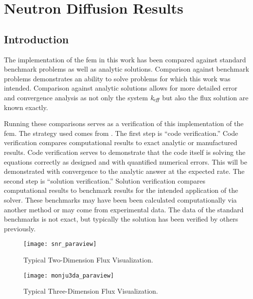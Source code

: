 \chapter{Neutron Diffusion Results}
\label{ch:diffusionResults}

\section{Introduction}
  The implementation of the \gls{fem} in this work has been compared
  against standard benchmark problems as well as analytic solutions. Comparison 
  against benchmark problems demonstrates an ability to solve problems for which 
  this work was intended. Comparison against analytic solutions allows for more 
  detailed error and convergence analysis as not only the system $k_{\!\mbox{\scriptsize \em eff}}$ but 
  also the flux solution are known exactly. 

  Running these comparisons serves as a verification of this implementation of 
  the \gls{fem}. The strategy used comes from \cite{oberkampf}. The first step is 
  ``code verification.'' Code verification compares computational results to 
  exact analytic or manufactured results. Code verification serves to 
  demonstrate that the code itself is solving the equations correctly as 
  designed and with quantified numerical errors. This will be demonstrated with 
  convergence to the analytic answer at the expected rate. The second step is 
  ``solution verification.'' Solution verification compares computational 
  results to benchmark results for the intended application of the solver. These 
  benchmarks may have been been calculated computationally via another method or 
  may come from experimental data.  The data of the standard benchmarks is not 
  exact, but typically the solution has been verified by others previously.

  \begin{figure}
    \centering
    \texttt{[image: snr\_paraview]}
    \caption{Typical Two-Dimension Flux Visualization.}
    \label{fig:snr_paraview}
  \end{figure}

  \begin{figure}
    \centering
    \texttt{[image: monju3da\_paraview]}
    \caption{Typical Three-Dimension Flux Visualization.}
    \label{fig:monju3da_paraview}
  \end{figure}

